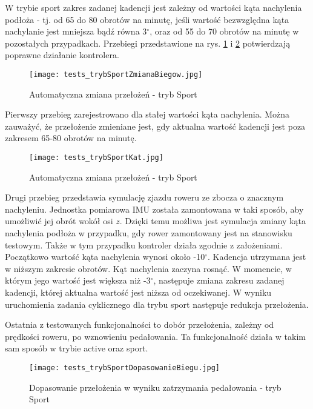 W trybie sport zakres zadanej kadencji jest zależny od wartości kąta nachylenia podłoża - tj. od 65 do 80 obrotów na minutę, jeśli wartość bezwzględna kąta nachylanie jest mniejsza bądź równa 3$^{\circ}$, oraz od 55 do 70 obrotów na minutę w pozostałych przypadkach. Przebiegi przedstawione na rys.  \ref{fig:tests_sportModeZmiana1} i \ref{fig:tests_sportModeZmiana2} potwierdzają poprawne działanie kontrolera.
\begin{figure}[h]
    \centering
    \texttt{[image: tests\_trybSportZmianaBiegow.jpg]}
    \caption{Automatyczna zmiana przełożeń - tryb Sport}
    \label{fig:tests_sportModeZmiana1}
\end{figure}
Pierwszy przebieg zarejestrowano dla stałej wartości kąta nachylenia. Można zauważyć, że przełożenie zmieniane jest, gdy aktualna wartość kadencji jest poza zakresem 65-80 obrotów na minutę. 
\begin{figure}[h]
    \centering
    \texttt{[image: tests\_trybSportKat.jpg]}
    \caption{Automatyczna zmiana przełożeń - tryb Sport}
    \label{fig:tests_sportModeZmiana2}
\end{figure}

Drugi przebieg przedstawia symulację zjazdu roweru ze zbocza o znacznym nachyleniu. Jednostka pomiarowa IMU została zamontowana w taki sposób, aby umożliwić jej obrót wokół osi $z$. Dzięki temu możliwa jest symulacja zmiany kąta nachylenia podłoża w przypadku, gdy rower zamontowany jest na stanowisku testowym. Także w tym przypadku kontroler działa zgodnie z założeniami. Początkowo wartość kąta nachylenia wynosi około -10$^{\circ}$. Kadencja utrzymana jest w niższym zakresie obrotów. Kąt nachylenia zaczyna rosnąć. W momencie, w którym jego wartość jest większa niż -3$^{\circ}$, następuje zmiana zakresu zadanej kadencji, której aktualna wartość jest niższa od oczekiwanej. W wyniku uruchomienia zadania cyklicznego dla trybu sport następuje redukcja przełożenia.

Ostatnia z testowanych funkcjonalności to dobór przełożenia, zależny od prędkości roweru, po wznowieniu pedałowania. Ta funkcjonalność działa w takim sam sposób w trybie active oraz sport.
\begin{figure}[h]
    \centering
    \texttt{[image: tests\_trybSportDopasowanieBiegu.jpg]}
    \caption{Dopasowanie przełożenia w wyniku zatrzymania pedałowania - tryb Sport}
    \label{fig:tests_gearSpeedSelection}
\end{figure}

